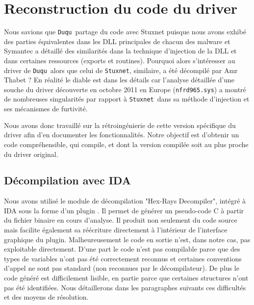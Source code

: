 \documentclass[times,11pt,fullpage]{article}
\newcommand{\Duqu}{\texttt{Duqu}}
\newcommand{\Stuxnet}{\texttt{Stuxnet}}
\newcommand{\driver}{\texttt{nfrd965.sys}}
\begin{document}
\section{Reconstruction du code du driver}
Nous savions que \Duqu\ partage du code avec Stuxnet puisque nous avons exhibé des parties équivalentes dans les DLL principales de chacun des malware \cite{AThierry_REAT12} et Symantec a détaillé des similarités dans la technique d'injection de la DLL et dans certaines ressources (exports et routines).
Pourquoi alors s'intéresser au driver de \Duqu\ alors que celui de \Stuxnet, similaire, a été décompilé par Amr Thabet \cite{AThierry_ThabetDriver} ?
En réalité le diable est dans les détails car l'analyse détaillée d'une souche du driver découverte en octobre 2011 en Europe (\driver) a montré de nombreuses singularités par rapport à \Stuxnet\ dans sa méthode d'injection et ses mécanismes de furtivité.

Nous avons donc travaillé sur la rétroingénierie de cette version spécifique du driver afin d'en documenter les fonctionnalités.
Notre objectif est d'obtenir un code compréhensible, qui compile, et dont la version compilée soit au plus proche du driver original.




\subsection{Décompilation avec IDA}

Nous avons utilisé le module de décompilation "Hex-Rays Decompiler", intégré à IDA sous la forme d'un plugin \cite{AThierry_IDADecompiler}. Il permet de générer un pseudo-code C à partir du fichier binaire en cours d'analyse. Il produit non seulement du code source mais facilite également sa réécriture directement à l'intérieur de l'interface graphique du plugin. %
Malheureusement le code en sortie n'est, dans notre cas, pas exploitable directement. D'une part le code n'est pas compilable parce que des types de variables n'ont pas été correctement reconnus et certaines conventions d'appel ne sont pas standard (non reconnues par le décompilateur). De plus le code généré est difficilement lisible, en partie parce que certaines structures n'ont pas été identifiées. Nous détaillerons dans les paragraphes suivants ces difficultés et des moyens de résolution.
\end{document}
